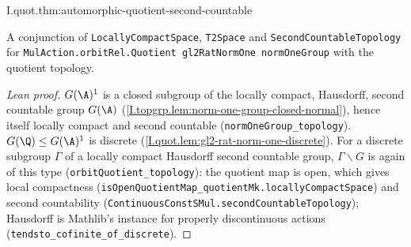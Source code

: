 \begin{theorem}
\end{theorem}
\begin{tfformal}{I.quot.thm:automorphic-quotient-second-countable}
\begin{tffidelity}
A conjunction of \texttt{LocallyCompactSpace}, \texttt{T2Space} and \texttt{SecondCountableTopology} for \texttt{MulAction.orbitRel.Quotient gl2RatNormOne normOneGroup} with the quotient topology.
\end{tffidelity}
\end{tfformal}
\begin{proof}[Lean proof]
$G(\A)^1$ is a closed subgroup of the locally compact, Hausdorff, second countable group $G(\A)$ (\cref{I.topgrp.lem:norm-one-group-closed-normal}), hence itself locally compact and second countable (\texttt{normOneGroup\_topology}). $G(\Q)\le G(\A)^1$ is discrete (\cref{I.quot.lem:gl2-rat-norm-one-discrete}). For a discrete subgroup $\Gamma$ of a locally compact Hausdorff second countable group, $\Gamma\backslash G$ is again of this type (\texttt{orbitQuotient\_topology}): the quotient map is open, which gives local compactness (\texttt{isOpenQuotientMap\_quotientMk.locallyCompactSpace}) and second countability (\texttt{ContinuousConstSMul.secondCountableTopology}); Hausdorff is Mathlib's instance for properly discontinuous actions (\texttt{tendsto\_cofinite\_of\_discrete}).
\end{proof}

